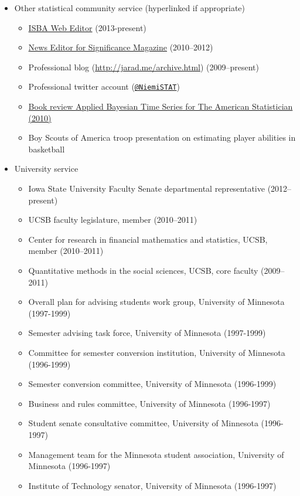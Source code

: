 \documentclass[overlapped,line,letterpaper]{res}
\begin{document}
\begin{resume}
\begin{itemize}
\item Other statistical community service (hyperlinked if appropriate)
 \begin{itemize}
 \item \href{http://bayesian.org/}{ISBA Web Editor} (2013-present)
 \item \href{http://www.significancemagazine.org/view/searchResults.html?s=&t=&q=jarad+niemi}{News Editor for Significance Magazine} (2010--2012)
 \item Professional blog (\url{http://jarad.me/archive.html}) (2009--present)
 \item Professional twitter account ({\tt \href{https://twitter.com/NiemiSTAT}{@NiemiSTAT}})
\item \href{http://pubs.amstat.org/doi/abs/10.1198/tast.2010.br643}{Book review \underline{Applied Bayesian Time Series} for The American Statistician (2010)}
\item Boy Scouts of America troop presentation on estimating player abilities in basketball
 \end{itemize}

\item University service
\begin{itemize}
\item Iowa State University Faculty Senate departmental representative (2012--present)
\item UCSB faculty legislature, member (2010--2011)
\item Center for research in financial mathematics and statistics, UCSB, member (2010--2011)
\item Quantitative methods in the social sciences, UCSB, core faculty (2009--2011)
\item Overall plan for advising students work group, University of Minnesota (1997-1999)
\item Semester advising task force, University of Minnesota (1997-1999)
\item Committee for semester conversion institution, University of Minnesota (1996-1999)
\item Semester conversion committee, University of Minnesota (1996-1999)
\item Business and rules committee, University of Minnesota (1996-1997)
\item Student senate consultative committee, University of Minnesota (1996-1997)
\item Management team for the Minnesota student association, University of Minnesota (1996-1997)
\item Institute of Technology senator, University of Minnesota (1996-1997)
 \end{itemize}


\end{itemize}
\end{resume}
\end{document}
